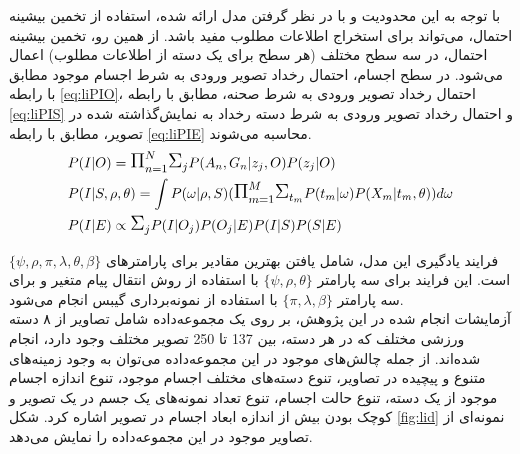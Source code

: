 \begin{enumerate}
	با توجه به این محدودیت و با در نظر گرفتن مدل ارائه شده، استفاده از تخمین بیشینه احتمال، می‌تواند برای استخراج اطلاعات مطلوب مفید باشد. از همین رو، تخمین بیشینه احتمال، در سه سطح مختلف (هر سطح برای یک دسته از اطلاعات مطلوب) اعمال می‌شود. در سطح اجسام، احتمال رخداد تصویر ورودی به شرط اجسام موجود مطابق با رابطه 
	\ref{eq:liPIO}، احتمال رخداد تصویر ورودی به شرط صحنه، مطابق با رابطه 
	\ref{eq:liPIS}
	و احتمال رخداد تصویر ورودی به شرط دسته رخداد به نمایش‌گذاشته شده در تصویر، مطابق با رابطه 
	\ref{eq:liPIE}
	محاسبه می‌شوند.
	\begin{align}
	&P(I|O) = \ML{\Pi}_{n=1}^N \ML{\Sigma}_j P(A_n,G_n|z_j,O) P(z_j|O)
	\label{eq:liPIO}
	\\
	&P(I|S,\rho,\theta) = \int P(\omega|\rho,S)(\ML{\Pi}_{m=1}^M \ML{\Sigma}_{t_m} P(t_m|\omega) P(X_m|t_m, \theta) ) d\omega
	\label{eq:liPIS}
	\\
	&P(I|E) \propto \ML{\Sigma}_j P(I|O_j) P(O_j|E) P(I|S) P(S|E)
	\label{eq:liPIE}
	\end{align}
	
	فرایند یادگیری این مدل، شامل یافتن بهترین مقادیر برای پارامترهای 
	$\{\psi,\rho,\pi,\lambda,\theta,\beta\}$
	است.
	این فرایند برای سه پارامتر 
	$\{\psi,\rho,\theta\}$ 
	با استفاده از روش انتقال پیام متغیر و برای سه پارامتر
	$\{\pi,\lambda,\beta\}$
	با استفاده از نمونه‌برداری گیبس انجام می‌شود.
	\\
	آزمایشات انجام شده در این پژوهش، بر روی یک مجموعه‌داده شامل تصاویر از ۸ دسته ورزشی مختلف که در هر دسته، بین 137 تا 250 تصویر مختلف وجود دارد، انجام شده‌اند. از جمله چالش‌های موجود در این مجموعه‌داده می‌توان به وجود زمینه‌های متنوع و پیچیده در تصاویر، تنوع دسته‌های مختلف اجسام موجود، تنوع اندازه اجسام موجود از یک دسته، تنوع حالت اجسام، تنوع تعداد نمونه‌های یک جسم در یک تصویر و کوچک بودن بیش از اندازه ابعاد اجسام در تصویر اشاره کرد. شکل
	\ref{fig:lid}
	نمونه‌ای از تصاویر موجود در این مجموعه‌داده را نمایش می‌دهد.
	

\end{enumerate}
